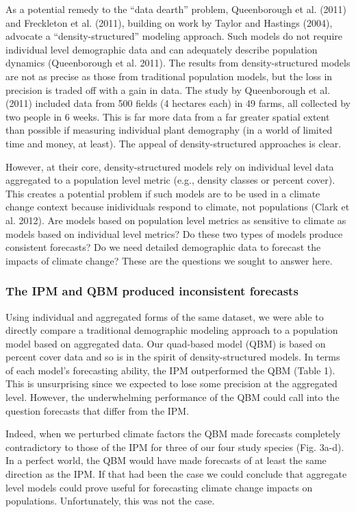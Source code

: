 \documentclass[12pt,]{article}
\begin{document}
As a potential remedy to the ``data dearth'' problem, Queenborough et
al. (2011) and Freckleton et al. (2011), building on work by Taylor and
Hastings (2004), advocate a ``density-structured'' modeling approach.
Such models do not require individual level demographic data and can
adequately describe population dynamics (Queenborough et al. 2011). The
results from density-structured models are not as precise as those from
traditional population models, but the loss in precision is traded off
with a gain in data. The study by Queenborough et al. (2011) included
data from 500 fields (4 hectares each) in 49 farms, all collected by two
people in 6 weeks. This is far more data from a far greater spatial
extent than possible if measuring individual plant demography (in a
world of limited time and money, at least). The appeal of
density-structured approaches is clear.

However, at their core, density-structured models rely on individual
level data aggregated to a population level metric (e.g., density
classes or percent cover). This creates a potential problem if such
models are to be used in a climate change context because inidividuals
respond to climate, not populations (Clark et al. 2012). Are models
based on population level metrics as sensitive to climate as models
based on individual level metrics? Do these two types of models produce
consistent forecasts? Do we need detailed demographic data to forecast
the impacts of climate change? These are the questions we sought to
answer here.

\subsubsection{The IPM and QBM produced inconsistent
forecasts}\label{the-ipm-and-qbm-produced-inconsistent-forecasts}

Using individual and aggregated forms of the same dataset, we were able
to directly compare a traditional demographic modeling approach to a
population model based on aggregated data. Our quad-based model (QBM) is
based on percent cover data and so is in the spirit of
density-structured models. In terms of each model's forecasting ability,
the IPM outperformed the QBM (Table 1). This is unsurprising since we
expected to lose some precision at the aggregated level. However, the
underwhelming performance of the QBM could call into the question
forecasts that differ from the IPM.

Indeed, when we perturbed climate factors the QBM made forecasts
completely contradictory to those of the IPM for three of our four study
species (Fig. 3a-d). In a perfect world, the QBM would have made
forecasts of at least the same direction as the IPM. If that had been
the case we could conclude that aggregate level models could prove
useful for forecasting climate change impacts on populations.
Unfortunately, this was not the case.
\end{document}
